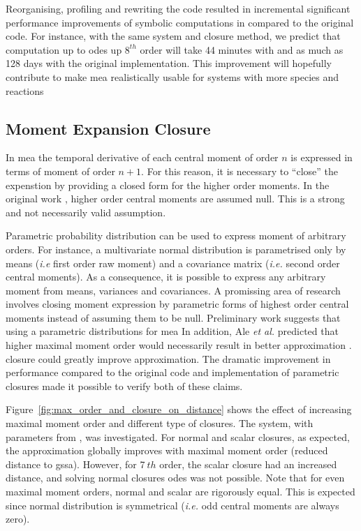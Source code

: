 Reorganising, profiling and rewriting the code resulted in incremental significant performance improvements of symbolic computations in \means{} compared to the original \mat{} code.
For instance, with the same \pft{} system and closure method, 
we predict that computation up to \gls{ode}s up $8^{th}$ order will take 44 minutes with \means{} and as much as 128 days with the original implementation.
This improvement will hopefully contribute to make \gls{mea} realistically usable for systems with more species and reactions


\subsection{Moment Expansion Closure}

In \gls{mea} the temporal derivative of each central moment of order $n$ is expressed in terms of moment of order $n+1$.
For this reason, it is necessary to ``close'' the expenstion by providing a closed form for the higher order moments.
In the original work \cite{ale_general_2013}, higher order central moments are assumed null. 
This is a strong and not necessarily valid assumption. 

Parametric probability distribution can be used to express moment of arbitrary orders. 
For instance, a multivariate normal distribution is parametrised only by means (\emph{i.e } first order raw moment)
and a covariance matrix (\emph{i.e.} second order central moments). 
As a consequence, it is possible to express any arbitrary moment from means, variances and covariances. 
A promissing area of research involves closing moment expression by parametric forms of highest order central moments instead
of assuming them to be null.
Preliminary work  suggests that using a parametric distributions for \gls{mea}
In addition, Ale \emph{et al.} predicted that higher maximal moment order would necessarily result in better approximation \cite{ale_general_2013}.
closure could greatly improve approximation.
The dramatic improvement in performance compared to the original code and implementation of parametric closures made it possible to verify both of these claims.

Figure~\ref{fig:max_order_and_closure_on_distance} shows the effect of increasing maximal moment order and different type of closures.
The \pft system, with parameters from \cite{ale_general_2013}, was investigated.
For normal and scalar closures, as expected, the approximation globally improves with maximal moment order (reduced distance to \gls{gssa}).
However, for 7$~{th}$ order, the scalar closure had an increased distance, and solving normal closures \gls{ode}s was not possible.
Note that for even maximal moment orders, normal and scalar are rigorously equal.
This is expected since normal distribution is symmetrical (\emph{i.e.} odd central moments are always zero).


